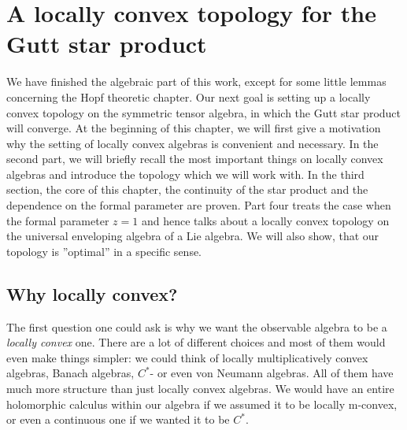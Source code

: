 
%
%

\chapter{A locally convex topology for the Gutt star product}

We have finished the algebraic part of this work, except for some little 
lemmas concerning the Hopf theoretic chapter. Our next goal is setting up a 
locally convex topology on the symmetric tensor algebra, in which the Gutt 
star product will converge. At the beginning of this chapter, we will 
first give a motivation why the setting of locally convex algebras is 
convenient and necessary. In the second part, we will briefly recall the most 
important things on locally convex algebras and introduce the topology which 
we will work with. In the third section, the core of this chapter, the 
continuity of the star product and the dependence on the formal parameter are 
proven. Part four treats the case when the formal parameter $z = 1$ and hence 
talks about a locally convex topology on the universal enveloping algebra of a 
Lie algebra. We will also show, that our topology is ''optimal'' in a specific 
sense.



\section{Why locally convex?}
\label{sec:chap5_Prelim}

The first question one could ask is why we want the observable algebra 
to be a \textit{locally convex} one. There are a lot of different choices 
and most of them would even make things simpler: we could think of 
locally multiplicatively convex algebras, Banach algebras, $C^*$- or even 
von Neumann algebras. All of them have much more structure than just 
locally convex algebras. We would have an entire holomorphic calculus 
within our algebra if we assumed it to be locally m-convex, or even a 
continuous one if we wanted it to be $C^*$.


